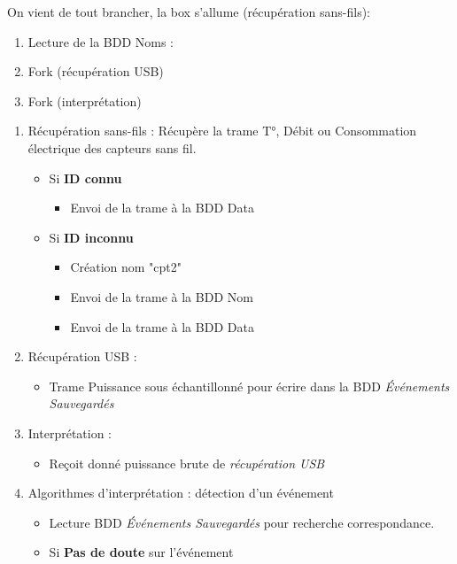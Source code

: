 \documentclass[10pt,a4paper]{article}
\begin{document}
On vient de tout brancher, la box s'allume (récupération sans-fils):
\begin{enumerate}
	\item Lecture de la BDD Noms : 
	\item Fork (récupération USB)
	\item Fork (interprétation) 
\end{enumerate}
\begin{enumerate}
	\item Récupération sans-fils : Récupère la trame T°, Débit ou Consommation électrique des capteurs sans fil.
	\begin{itemize}
		\item Si \textbf{ID connu}  
		\begin{itemize}
			\item Envoi de la trame à la BDD Data  	
		\end{itemize} 
	\end{itemize}
	\begin{itemize}
		\item Si \textbf{ID inconnu}
		\begin{itemize}
			\item Création nom "cpt2"
			\item Envoi de la trame à la BDD Nom 
			\item Envoi de la trame à la BDD Data 
		\end{itemize}
	\end{itemize}
	\item Récupération USB : 
	\begin{itemize}
		\item Trame Puissance sous échantillonné pour écrire dans la BDD  \textit{Événements Sauvegardés}
	\end{itemize}
	\item Interprétation : 
	\begin{itemize}
		\item Reçoit donné puissance brute de \textit{récupération USB}
	\end{itemize}	 
	\item Algorithmes d'interprétation : détection d'un événement
	\begin{itemize}		
		\item Lecture BDD  \textit{Événements Sauvegardés} pour recherche correspondance.
		\item Si \textbf{Pas de doute} sur l'événement

\end{itemize}
\end{enumerate}
\end{document}
